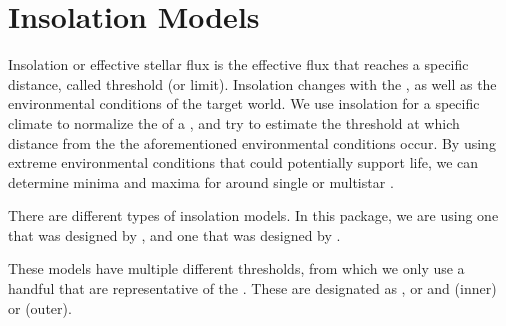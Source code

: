 \documentclass[letterpaper,10pt,english]{sphinxmanual}
\begin{document}
\section{Insolation Models}
\label{\detokenize{quantities/insolation_models/insolation_models:insolation-models}}\label{\detokenize{quantities/insolation_models/insolation_models::doc}}\label{\detokenize{quantities/insolation_models/insolation_models:id1}}
\sphinxAtStartPar
Insolation or effective stellar flux is the effective flux that
reaches a specific {\hyperref[\detokenize{quantities/orbital/orbital:id1}]{}} distance, called threshold (or limit).
Insolation changes with the {\hyperref[\detokenize{celestial_bodies/star:id1}]{}} {\hyperref[\detokenize{quantities/surface/emission/temperature:id1}]{}},
as well as the environmental conditions of the target {\hyperref[\detokenize{quantities/habitability/habitability:id1}]{}} world.
We use insolation for a specific climate to normalize the
{\hyperref[\detokenize{quantities/surface/emission/luminosity:id1}]{}} of a {\hyperref[\detokenize{celestial_bodies/star:id1}]{}},
and try to estimate the threshold at which distance from
the {\hyperref[\detokenize{celestial_bodies/star:id1}]{}} the aforementioned environmental conditions occur.
By using extreme environmental conditions that could potentially support life,
we can determine minima and maxima for {\hyperref[\detokenize{quantities/habitability/habitable_zones/habitable_zones:id1}]{}}
around single\sphinxhyphen{} or multi\sphinxhyphen{}star {\hyperref[\detokenize{celestial_systems/celestial_systems:id1}]{}}.

\sphinxAtStartPar
There are different types of insolation models. In this package,
we are using one that was designed by {\hyperref[\detokenize{quantities/insolation_models/kopparapu/kopparapu:kopparapu-insolation-model}]{}}, and
one that was designed by {\hyperref[\detokenize{quantities/insolation_models/selsis/selsis:selsis-insolation-model}]{}}.

\sphinxAtStartPar
These models have multiple different thresholds, from which
we only use a handful that are representative of the {\hyperref[\detokenize{quantities/habitability/habitable_zones/habitable_zones:id1}]{}}.
These are designated as ,  or  and  (inner) or  (outer).
\end{document}
